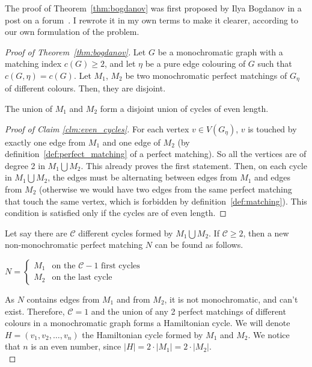 The proof of Theorem~\ref{thm:bogdanov} was first proposed by Ilya Bogdanov in a post on a forum~\cite{bogdanov}.
I rewrote it in my own terms to make it clearer, according to our own formulation of the problem.

\begin{proof}[Proof of Theorem~\ref{thm:bogdanov}]
    Let $G$ be a monochromatic graph with a matching index $c(G) \geq 2$, and let $\eta$ be a pure edge colouring of $G$ such that $c(G, \eta) = c(G)$.
    Let $M_1$, $M_2$ be two monochromatic perfect matchings of $G_\eta$ of different colours.
    Then, they are disjoint.
    
    \begin{claim}
        \label{clm:even_cycles}
        The union of $M_1$ and $M_2$ form a disjoint union of cycles of even length.
    \end{claim}
    
    \begin{proof}[Proof of Claim \ref{clm:even_cycles}]
        For each vertex $v \in V(G_\eta)$, $v$ is touched by exactly one edge from $M_1$ and one edge of $M_2$ (by definition~\ref{def:perfect_matching} of a perfect matching).
        So all the vertices are of degree 2 in $M_1 \bigcup M_2$.
        This already proves the first statement.
        Then, on each cycle in $M_1 \bigcup M_2$, the edges must be alternating between edges from $M_1$ and edges from $M_2$ (otherwise we would have two edges from the same perfect matching that touch the same vertex, which is forbidden by definition~\ref{def:matching}).
        This condition is satisfied only if the cycles are of even length.
    \end{proof}
    
    Let say there are $\mathcal{C}$ different cycles formed by $M_1 \bigcup M_2$.
    If $\mathcal{C} \geq 2$, then a new non-monochromatic perfect matching $N$ can be found as follows.
    
    \begin{center}
        $N = \left\{
        \begin{array}{ll}
            M_1 & \mbox{on the } \mathcal{C} - 1 \mbox{ first cycles} \\
            M_2 & \mbox{on the last cycle}
        \end{array}
        \right.$
    \end{center}

    As $N$ contains edges from $M_1$ and from $M_2$, it is not monochromatic, and can't exist.
    Therefore, $\mathcal{C} = 1$ and the union of any 2 perfect matchings of different colours in a monochromatic graph forms a Hamiltonian cycle.
    We will denote $H = (v_1, v_2, \dots, v_n)$ the Hamiltonian cycle formed by $M_1$ and $M_2$.
    We notice that $n$ is an even number, since $|H| = 2 \cdot |M_1| = 2 \cdot |M_2|$.\\


\end{proof}
